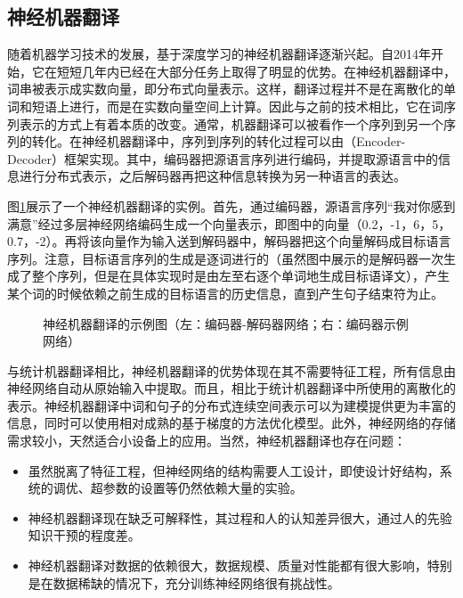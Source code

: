 \subsection{神经机器翻译}

\parinterval 随着机器学习技术的发展，基于深度学习的神经机器翻译逐渐兴起。自2014年开始，它在短短几年内已经在大部分任务上取得了明显的优势。在神经机器翻译中，词串被表示成实数向量，即分布式向量表示。这样，翻译过程并不是在离散化的单词和短语上进行，而是在实数向量空间上计算。因此与之前的技术相比，它在词序列表示的方式上有着本质的改变。通常，机器翻译可以被看作一个序列到另一个序列的转化。在神经机器翻译中，序列到序列的转化过程可以由{\small{}}（Encoder-Decoder）框架实现。其中，编码器把源语言序列进行编码，并提取源语言中的信息进行分布式表示，之后解码器再把这种信息转换为另一种语言的表达。

\parinterval 图\ref{fig:1-16}展示了一个神经机器翻译的实例。首先，通过编码器，源语言序列“我对你感到满意”经过多层神经网络编码生成一个向量表示，即图中的向量（0.2，-1，6，5，0.7，-2）。再将该向量作为输入送到解码器中，解码器把这个向量解码成目标语言序列。注意，目标语言序列的生成是逐词进行的（虽然图中展示的是解码器一次生成了整个序列，但是在具体实现时是由左至右逐个单词地生成目标语译文），产生某个词的时候依赖之前生成的目标语言的历史信息，直到产生句子结束符为止。

\begin{figure}[htp]
    \centering

    \caption{神经机器翻译的示例图（左：编码器-解码器网络；右：编码器示例网络）}
    \label{fig:1-16}
\end{figure}

\parinterval 与统计机器翻译相比，神经机器翻译的优势体现在其不需要特征工程，所有信息由神经网络自动从原始输入中提取。而且，相比于统计机器翻译中所使用的离散化的表示。神经机器翻译中词和句子的分布式连续空间表示可以为建模提供更为丰富的信息，同时可以使用相对成熟的基于梯度的方法优化模型。此外，神经网络的存储需求较小，天然适合小设备上的应用。当然，神经机器翻译也存在问题：
\begin{itemize}
\vspace{0.5em}
\item 虽然脱离了特征工程，但神经网络的结构需要人工设计，即使设计好结构，系统的调优、超参数的设置等仍然依赖大量的实验。
\vspace{0.5em}
\item 神经机器翻译现在缺乏可解释性，其过程和人的认知差异很大，通过人的先验知识干预的程度差。
\vspace{0.5em}
\item 神经机器翻译对数据的依赖很大，数据规模、质量对性能都有很大影响，特别是在数据稀缺的情况下，充分训练神经网络很有挑战性。
\vspace{0.5em}
\end{itemize}

